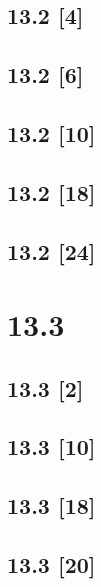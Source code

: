 \documentclass{article}
\begin{document}
\subsection*{13.2 [4]}
\subsection*{13.2 [6]}
\subsection*{13.2 [10]}
\subsection*{13.2 [18]}
\subsection*{13.2 [24]}

\newpage

\section*{13.3}
\setcounter{equation}{0}

\subsection*{13.3 [2]}
\subsection*{13.3 [10]}
\subsection*{13.3 [18]}
\subsection*{13.3 [20]}
\end{document}
